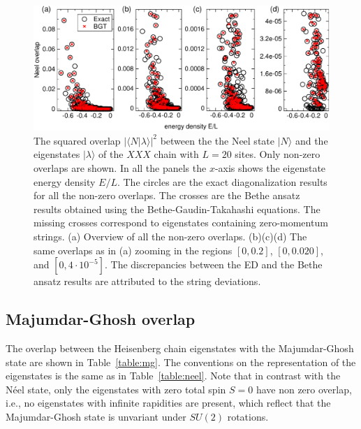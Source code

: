 \documentclass[11pt]{iopart}
\begin{document}
\begin{figure}[t]
\begin{center}
\includegraphics[width=.9\textwidth]{./draft_figs/L20_BT_check}
\end{center}
\caption{ The squared overlap $|\langle N|\lambda\rangle|^2$ between the the 
 Neel state $|N\rangle$ and the eigenstates $|\lambda\rangle$ of the $XXX$ 
 chain with $L=20$ sites. Only non-zero overlaps are shown. In all the panels the 
 $x$-axis shows the eigenstate energy density $E/L$. The circles are the exact 
 diagonalization results for all the non-zero overlaps. The crosses are the Bethe 
 ansatz results obtained using the Bethe-Gaudin-Takahashi equations. The missing 
 crosses correspond to eigenstates containing zero-momentum strings. (a) Overview 
 of all the non-zero overlaps. (b)(c)(d) The same overlaps as in (a) zooming in 
 the regions $[0,0.2]$, $[0,0.020]$, and $[0,4\cdot 10^{-5}]$. The discrepancies 
 between the ED and the Bethe ansatz results are attributed to the string 
 deviations. 
}
\label{fig1-BGT-check}
\end{figure}

\subsection{Majumdar-Ghosh overlap}
\label{app-mg}
The overlap between the Heisenberg chain eigenstates with the Majumdar-Ghosh state are shown in 
Table~\ref{table:mg}. The conventions on the representation of the eigenstates is the same as in 
Table~\ref{table:neel}. Note that in contrast with the N\'eel state, only the eigenstates with 
zero total spin $S=0$ have non zero overlap, i.e., no eigenstates with infinite rapidities are 
present, which reflect that the Majumdar-Ghosh state is unvariant under $SU(2)$ rotations. 
\end{document}
